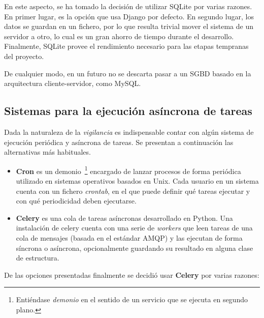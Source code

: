 En este aspecto, se ha tomado la decisión de utilizar SQLite por varias
razones. En primer lugar, es la opción que usa Django por defecto. En segundo
lugar, los datos se guardan en un fichero, por lo que resulta trivial mover el
sistema de un servidor a otro, lo cual es un gran ahorro de tiempo durante el
desarrollo. Finalmente, SQLite provee el rendimiento necesario para las etapas
tempranas del proyecto.

De cualquier modo, en un futuro no se descarta pasar a un SGBD basado en la
arquitectura cliente-servidor, como MySQL.

\subsection{Sistemas para la ejecución asíncrona de tareas}

Dada la naturaleza de la \textit{vigilancia} es indispensable contar con algún
sistema de ejecución periódica y asíncrona de tareas. Se presentan a
continuación las alternativas más habituales.

\begin{itemize}
\item \textbf{Cron}\cite{cron} es un demonio~\footnote{Entiéndase \textit{demonio} en el
    sentido de un servicio que se ejecuta en segundo plano.} encargado de lanzar
  procesos de forma periódica utilizado en sistemas operativos basados en
  Unix. Cada usuario en un sistema cuenta con un fichero \textit{crontab}, en el
  que puede definir qué tareas ejecutar y con qué periodicidad deben ejecutarse. 

\item \textbf{Celery}\cite{celery} es una cola de tareas asíncronas desarrollado en
  Python. Una instalación de celery cuenta con una serie de \textit{workers} que
  leen tareas de una cola de mensajes (basada en el estándar \ac{AMQP}) y las
  ejecutan de forma síncrona o asíncrona, opcionalmente guardando su resultado
  en alguna clase de estructura. 

\end{itemize}

De las opciones presentadas finalmente se decidió usar \textbf{Celery} por
varias razones:

